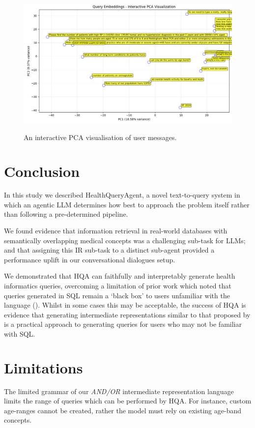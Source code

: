 \documentclass[11pt]{article}
\begin{document}
\begin{figure}[t]
  \includegraphics[width=\linewidth]{content/pca_09_16_randomly_sampled_20.png}
  \label{fig:sample-user-utterances}
  \caption{
    An interactive PCA visualisation of user messages.
  }
\end{figure}

\section{Conclusion}
In this study we described HealthQueryAgent, a novel text-to-query system in which an agentic LLM determines how best to approach the problem itself rather than following a pre-determined pipeline.

We found evidence that information retrieval in real-world databases with semantically overlapping medical concepts was a challenging sub-task for LLMs; and that assigning this IR sub-task to a distinct sub-agent provided a performance uplift in our conversational dialogues setup.

We demonstrated that HQA can faithfully and interpretably generate health informatics queries, overcoming a limitation of prior work which noted that queries generated in SQL remain a `black box' to users unfamiliar with the language  (\citet{ziletti_generating_2025}).
Whilst in some cases this may be acceptable, the success of HQA is evidence that generating intermediate representations similar to that proposed by \citet{guo_towards_2019} is a practical approach to generating queries for users who may not be familiar with SQL.


\section{Limitations}
The limited grammar of our \textit{AND/OR} intermediate representation language limits the range of queries which can be performed by HQA.
For instance, custom age-ranges cannot be created, rather the model must rely on existing age-band concepts.
\end{document}
